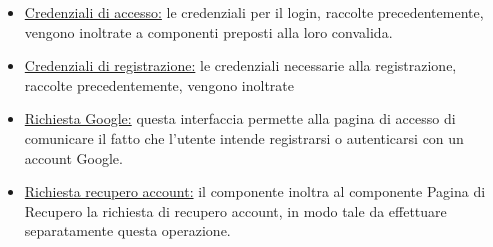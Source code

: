\documentclass[11pt, a4paper]{article}
\theoremstyle{definition} %
\begin{document}
\begin{description}
\begin{itemize}
        \item \underline{Credenziali di accesso:} le credenziali per il login,
        raccolte precedentemente, vengono inoltrate a componenti preposti alla
        loro convalida.

        \item \underline{Credenziali di registrazione:} le credenziali necessarie
        alla registrazione, raccolte precedentemente, vengono inoltrate 

        \item \underline{Richiesta Google:} questa interfaccia permette alla
        pagina di accesso di comunicare il fatto che l'utente intende registrarsi
        o autenticarsi con un account Google.

        \item \underline{Richiesta recupero account:} il componente inoltra
        al componente Pagina di Recupero la richiesta di recupero account, in modo
        tale da effettuare separatamente questa operazione.
    \end{itemize}
\end{description}
\fi
\end{document}
